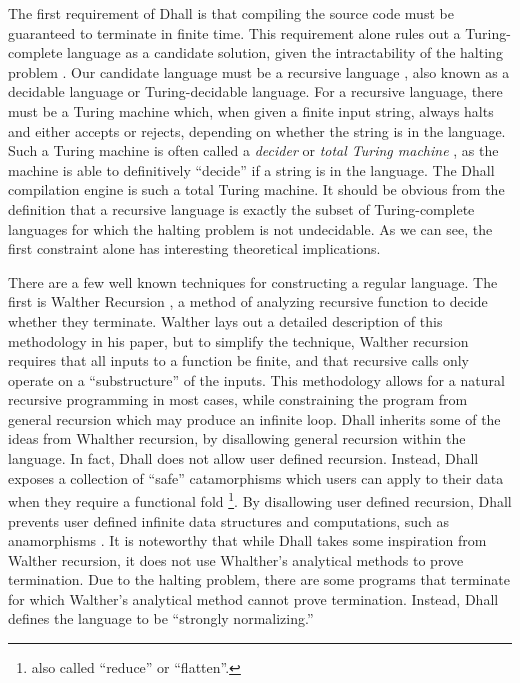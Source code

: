 \documentclass[12pt]{diazessay}
\begin{document}
The first requirement of Dhall is that compiling the source code must be guaranteed to terminate in finite time.
This requirement alone rules out a Turing-complete language as a candidate solution, given the intractability of the halting problem \cite{turing1937computable}.
Our candidate language must be a recursive language \cite{yu1997regular}, also known as a decidable language or Turing-decidable language.
For a recursive language, there must be a Turing machine which, when given a finite input string, always halts and either accepts or rejects, depending on whether the string is in the language.
Such a Turing machine is often called a \emph{decider} \cite{10.1145/230514.571645} or \emph{total Turing machine} \cite{kozen1997more}, as the machine is able to definitively ``decide'' if a string is in the language.
The Dhall compilation engine is such a total Turing machine.
It should be obvious from the definition that a recursive language is exactly the subset of Turing-complete languages for which the halting problem is not undecidable.
As we can see, the first constraint alone has interesting theoretical implications.

There are a few well known techniques for constructing a regular language.
The first is Walther Recursion \cite{walther1994proving}, a method of analyzing recursive function to decide whether they terminate.
Walther lays out a detailed description of this methodology in his paper, but to simplify the technique, Walther recursion requires that all inputs to a function be finite, and that recursive calls only operate on a ``substructure'' of the inputs.
This methodology allows for a natural recursive programming in most cases, while constraining the program from general recursion which may produce an infinite loop.
Dhall inherits some of the ideas from Whalther recursion, by disallowing general recursion within the language.
In fact, Dhall does not allow user defined recursion.
Instead, Dhall exposes a collection of ``safe'' catamorphisms \cite{meijer1991functional} which users can apply to their data when they require a functional fold \footnote{also called ``reduce'' or ``flatten''.}.
By disallowing user defined recursion, Dhall prevents user defined infinite data structures and computations, such as anamorphisms \cite{meijer1991functional}.
It is noteworthy that while Dhall takes some inspiration from Walther recursion, it does not use Whalther's analytical methods to prove termination.
Due to the halting problem, there are some programs that terminate for which Walther's analytical method cannot prove termination.
Instead, Dhall defines the language to be ``strongly normalizing.''
\end{document}
